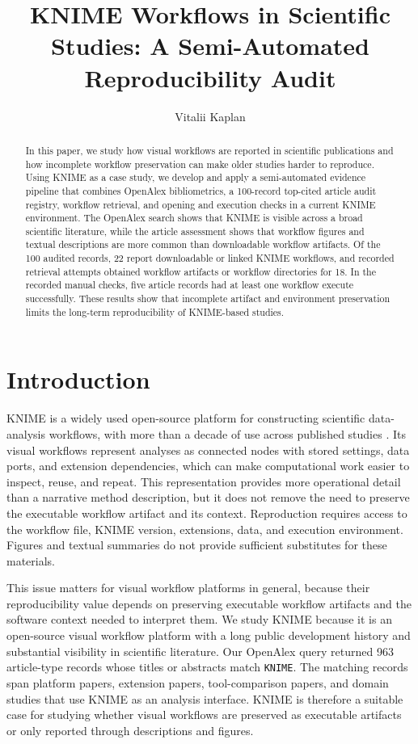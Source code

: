 \documentclass[runningheads]{llncs}
\title{KNIME Workflows in Scientific Studies: A Semi-Automated Reproducibility Audit}
\author{Vitalii Kaplan\orcidID{0009-0009-8181-2863}}
\institute{\email{2333275007@alu.istinye.edu.tr}}
\begin{document}
\maketitle

\begin{abstract}
In this paper, we study how visual workflows are reported in scientific
publications and how incomplete workflow preservation can make older studies
harder to reproduce. Using KNIME as a case study, we develop and apply a
semi-automated evidence pipeline that combines OpenAlex bibliometrics, a
100-record top-cited article audit registry, workflow retrieval, and opening
and execution checks in a current KNIME environment. The OpenAlex search shows
that KNIME is visible across a broad scientific literature, while the article
assessment shows that workflow figures and textual descriptions are more
common than downloadable workflow artifacts. Of the 100 audited records, 22
report downloadable or linked KNIME workflows, and recorded retrieval attempts
obtained workflow artifacts or workflow directories for 18. In the
recorded manual checks, five article records had at least one workflow execute
successfully. These results show that incomplete artifact and environment
preservation limits the long-term reproducibility of KNIME-based studies.

\end{abstract}

\section{Introduction}

KNIME is a widely used open-source platform for constructing scientific
data-analysis workflows, with more than a decade of use across published
studies \cite{Berthold2009KNIME}. Its visual workflows represent analyses as
connected nodes with
stored settings, data ports, and extension dependencies, which can make
computational work easier to inspect, reuse, and repeat. This representation
provides more operational detail than a narrative method description, but it
does not remove the need to preserve the executable workflow artifact and its
context. Reproduction requires access to the workflow file, KNIME version,
extensions, data, and execution environment. Figures and textual summaries do
not provide sufficient substitutes for these materials.

This issue matters for visual workflow platforms in general, because their
reproducibility value depends on preserving executable workflow artifacts and
the software context needed to interpret them. We study KNIME because it is an
open-source visual workflow platform with a long public development history and
substantial visibility in scientific literature. Our OpenAlex query returned
963 article-type records whose titles or abstracts match \texttt{KNIME}. The
matching records span platform papers, extension papers, tool-comparison
papers, and domain studies that use KNIME as an analysis interface. KNIME is
therefore a suitable case for studying whether visual workflows are preserved
as executable artifacts or only reported through descriptions and figures.
\end{document}
